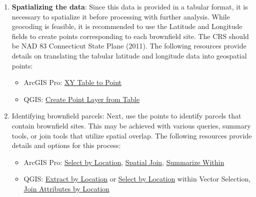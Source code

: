\documentclass[
  letterpaper,
  DIV=11,
  numbers=noendperiod]{scrreprt}
\providecommand{\tightlist}{%
  \setlength{\itemsep}{0pt}\setlength{\parskip}{0pt}}
\begin{document}
\begin{enumerate}
\def\labelenumi{\arabic{enumi}.}
\item
  \textbf{Spatializing the data}: Since this data is provided in a
  tabular format, it is necessary to spatialize it before processing
  with further analysis. While geocoding is feasible, it is recommended
  to use the Latitude and Longitude fields to create points
  corresponding to each brownfield site. The CRS should be NAD 83
  Connecticut State Plane (2011). The following resources provide
  details on translating the tabular latitude and longitude data into
  geospatial points:

  \begin{itemize}
  \tightlist
  \item
    ArcGIS Pro:
    \href{https://doc.esri.com/en/arcgis-pro/latest/tool-reference/data-management/xy-table-to-point.html?tabs=dialog}{XY
    Table to Point}
  \item
    QGIS:
    \href{https://qgis-tuts-wu.readthedocs.io/en/latest/land_degradation_development/interpolation/loading_table.html}{Create
    Point Layer from Table}
  \end{itemize}
\item
  Identifying brownfield parcels: Next, use the points to identify
  parcels that contain brownfield sites. This may be achieved with
  various queries, summary tools, or join tools that utilize spatial
  overlap. The following resources provide details and options for this
  process:

  \begin{itemize}
  \tightlist
  \item
    ArcGIS Pro:
    \href{https://doc.esri.com/en/arcgis-pro/latest/help/mapping/navigation/select-features-by-location.html}{Select
    by Location},
    \href{https://doc.esri.com/en/arcgis-pro/latest/tool-reference/analysis/spatial-join.html?tabs=dialog}{Spatial
    Join},
    \href{https://doc.esri.com/en/arcgis-pro/latest/tool-reference/analysis/summarize-within.html?tabs=dialog}{Summarize
    Within}
  \item
    QGIS:
    \href{https://docs.qgis.org/3.44/en/docs/user_manual/processing_algs/qgis/vectorselection.html\#extract-by-location}{Extract
    by Location} or
    \href{https://docs.qgis.org/3.44/en/docs/user_manual/processing_algs/qgis/vectorselection.html\#select-by-location}{Select
    by Location} within Vector Selection,
    \href{https://www.qgistutorials.com/en/docs/3/performing_spatial_joins.html}{Join
    Attributes by Location}
  \end{itemize}
\end{enumerate}
\end{document}

